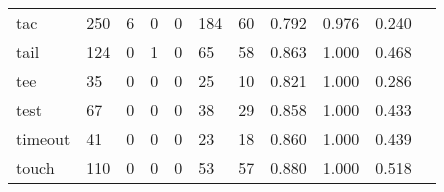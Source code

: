 \begin{longtable}{lp{1.2cm}p{1.2cm}p{1.2cm}p{1.2cm}p{1.2cm}p{1.2cm}p{1.2cm}p{1.2cm}p{1.2cm}p{1.2cm}}
tac       &                                   250 &                                                  6 &                                                  0 &                                                  0 &                                                184 &                                                 60 &                                              0.792 &                                              0.976 &                                              0.240 \\
tail      &                                   124 &                                                  0 &                                                  1 &                                                  0 &                                                 65 &                                                 58 &                                              0.863 &                                              1.000 &                                              0.468 \\
tee       &                                    35 &                                                  0 &                                                  0 &                                                  0 &                                                 25 &                                                 10 &                                              0.821 &                                              1.000 &                                              0.286 \\
test      &                                    67 &                                                  0 &                                                  0 &                                                  0 &                                                 38 &                                                 29 &                                              0.858 &                                              1.000 &                                              0.433 \\
timeout   &                                    41 &                                                  0 &                                                  0 &                                                  0 &                                                 23 &                                                 18 &                                              0.860 &                                              1.000 &                                              0.439 \\
touch     &                                   110 &                                                  0 &                                                  0 &                                                  0 &                                                 53 &                                                 57 &                                              0.880 &                                              1.000 &                                              0.518 \\

\end{longtable}
